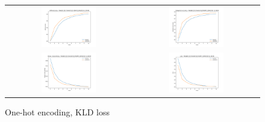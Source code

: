 \begin{appendices}
        \begin{figure}[H]
            \centering
            \begin{tabular}{cc}
                \includegraphics[width=0.45\textwidth]{figures/training_plots/ModelB-(1D)-OneHot-KLD-ADAM_13-04-2019_11-59-08_AON-accuracy.pdf} & \includegraphics[width=0.45\textwidth]{figures/training_plots/ModelB-(1D)-OneHot-KLD-ADAM_13-04-2019_11-59-08_categorical-accuracy.pdf} \\
                \includegraphics[width=0.45\textwidth]{figures/training_plots/ModelB-(1D)-OneHot-KLD-ADAM_13-04-2019_11-59-08_binary-cross-entropy.pdf} & \includegraphics[width=0.45\textwidth]{figures/training_plots/ModelB-(1D)-OneHot-KLD-ADAM_13-04-2019_11-59-08_loss.pdf}
            \end{tabular}
            \caption*{One-hot encoding, KLD loss}
        \end{figure}
        

\end{appendices}
